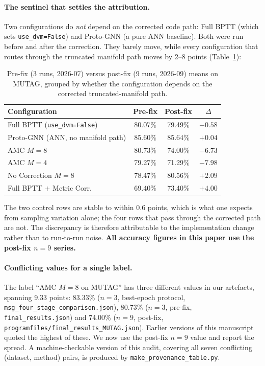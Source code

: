 \documentclass[a4paper,fleqn]{cas-dc}
\begin{document}
\paragraph{The sentinel that settles the attribution.}
Two configurations do \emph{not} depend on the corrected code path:
Full BPTT (which sets \texttt{use\_dvm=False}) and Proto-GNN (a pure ANN
baseline). Both were run before and after the correction. They barely
move, while every configuration that routes through the truncated
manifold path moves by 2--8 points (Table~\ref{tab:sentinel}):

\begin{table}[htbp]
\centering\footnotesize
\caption{Pre-fix (3 runs, 2026-07) versus post-fix (9 runs, 2026-09)
means on MUTAG, grouped by whether the configuration depends on the
corrected truncated-manifold path.}
\label{tab:sentinel}
\begin{tabular}{@{}p{3.3cm}ccc@{}}
\toprule
Configuration & Pre-fix & Post-fix & $\Delta$ \\
\midrule
Full BPTT (\texttt{use\_dvm=False}) & 80.07\% & 79.49\% & $-0.58$ \\
Proto-GNN (ANN, no manifold path) & 85.60\% & 85.64\% & $+0.04$ \\
\midrule
AMC $M{=}8$ & 80.73\% & 74.00\% & $-6.73$ \\
AMC $M{=}4$ & 79.27\% & 71.29\% & $-7.98$ \\
No Correction $M{=}8$ & 78.47\% & 80.56\% & $+2.09$ \\
Full BPTT $+$ Metric Corr. & 69.40\% & 73.40\% & $+4.00$ \\
\bottomrule
\end{tabular}
\end{table}

The two control rows are stable to within 0.6 points, which is what one
expects from sampling variation alone; the four rows that pass through
the corrected path are not. The discrepancy is therefore attributable to
the implementation change rather than to run-to-run noise. \textbf{All
accuracy figures in this paper use the post-fix $n{=}9$ series.}

\paragraph{Conflicting values for a single label.}
The label ``AMC $M{=}8$ on MUTAG'' has three different values in our
artefacts, spanning 9.33 points: 83.33\% ($n{=}3$, best-epoch protocol,
\texttt{msg\_four\_stage\_comparison.json}), 80.73\% ($n{=}3$, pre-fix,
\texttt{final\_results.json}) and 74.00\% ($n{=}9$, post-fix,
\texttt{programfiles/final\_results\_MUTAG.json}). Earlier versions of
this manuscript quoted the highest of these. We now use the post-fix
$n{=}9$ value and report the spread. A machine-checkable version of this
audit, covering all seven conflicting (dataset, method) pairs, is
produced by \texttt{make\_provenance\_table.py}.
\end{document}
